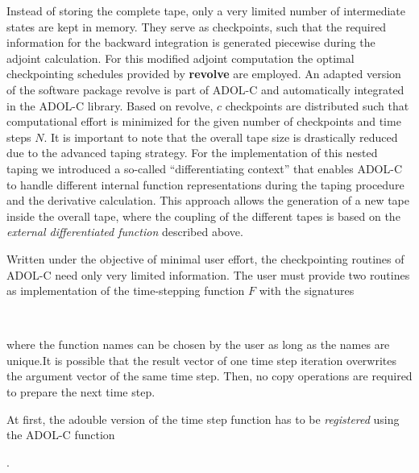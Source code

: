 \documentclass[11pt,twoside]{article}
\begin{document}
Instead of storing the complete tape, only a very limited number of intermediate
states are kept in memory. They serve as checkpoints, such that
the required information for the backward integration is generated
piecewise during the adjoint calculation.
For this modified adjoint computation the optimal checkpointing schedules
provided by {\bf revolve} are employed. An adapted version of the
software package {\sf revolve} is part of ADOL-C and automatically
integrated in the ADOL-C library. Based on {\sf revolve}, $c$ checkpoints are
distributed such that computational effort is minimized for the given
number of checkpoints and time steps $N$. It is important to note that the overall tape
size is drastically reduced due to the advanced taping strategy.  For the
implementation of this nested taping we introduced 
a so-called ``differentiating context'' that enables \mbox{ADOL-C} to
handle different internal function representations during the taping 
procedure and the derivative calculation. This approach allows the generation of a new
tape inside the overall tape, where the coupling of the different tapes is based on
the {\em external differentiated function} described above.

Written under the objective of minimal user effort, the checkpointing routines
of \mbox{ADOL-C} need only very limited information. The user must
provide two routines as implementation of the time-stepping function $F$ 
with the signatures
\medskip

\noindent
\hspace*{2cm}{\sf int time\_step\_function(int n, adouble *u);}\\
\hspace*{2cm}{\sf int time\_step\_function(int n, double *u);}
\medskip

\noindent
where the function names can be chosen by the user as long as the names are
unique.It is possible that the result vector of one time step
iteration overwrites the argument vector of the same time step. Then, no
copy operations are required to prepare the next time step.

At first, the {\sf adouble} version of the time step function has to
be {\em registered} using the \mbox{ADOL-C} function
\medskip

\noindent
\hspace*{2cm}{\sf CP\_Context cpc(time\_step\_function);}.
\medskip
\end{document}
